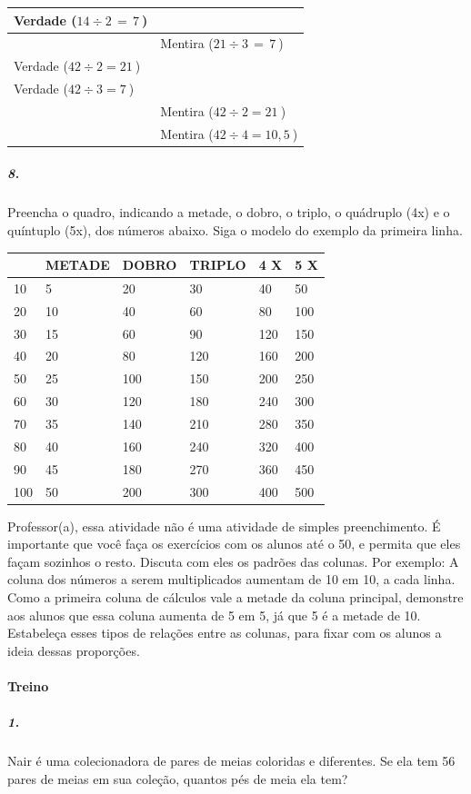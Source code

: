 \begin{longtable}[]{@{}ll@{}}
\toprule
Verdade (\(14 \div 2\, = \, 7\ \)) &\tabularnewline
\midrule
\endhead
& Mentira (\(21 \div 3\, = \, 7\ \))\tabularnewline
Verdade (\(42 \div 2 = 21\ \)) &\tabularnewline
Verdade (\(42 \div 3 = 7\ \)) &\tabularnewline
& Mentira (\(42 \div 2 = 21\ \))\tabularnewline
& Mentira (\(42 \div 4 = 10,5\ \))\tabularnewline
\bottomrule
\end{longtable}

\subparagraph{8.}\label{section-96}

Preencha o quadro, indicando a metade, o dobro, o triplo, o quádruplo
(4x) e o quíntuplo (5x), dos números abaixo. Siga o modelo do exemplo da
primeira linha.

\begin{longtable}[]{@{}llllll@{}}
\toprule
& METADE & DOBRO & TRIPLO & 4 X & 5 X\tabularnewline
\midrule
\endhead
10 & 5 & 20 & 30 & 40 & 50\tabularnewline
20 & 10 & 40 & 60 & 80 & 100\tabularnewline
30 & 15 & 60 & 90 & 120 & 150\tabularnewline
40 & 20 & 80 & 120 & 160 & 200\tabularnewline
50 & 25 & 100 & 150 & 200 & 250\tabularnewline
60 & 30 & 120 & 180 & 240 & 300\tabularnewline
70 & 35 & 140 & 210 & 280 & 350\tabularnewline
80 & 40 & 160 & 240 & 320 & 400\tabularnewline
90 & 45 & 180 & 270 & 360 & 450\tabularnewline
100 & 50 & 200 & 300 & 400 & 500\tabularnewline
\bottomrule
\end{longtable}

Professor(a), essa atividade não é uma atividade de simples
preenchimento. É importante que você faça os exercícios com os alunos
até o 50, e permita que eles façam sozinhos o resto. Discuta com eles os
padrões das colunas. Por exemplo: A coluna dos números a serem
multiplicados aumentam de 10 em 10, a cada linha. Como a primeira coluna
de cálculos vale a metade da coluna principal, demonstre aos alunos que
essa coluna aumenta de 5 em 5, já que 5 é a metade de 10. Estabeleça
esses tipos de relações entre as colunas, para fixar com os alunos a
ideia dessas proporções.

\paragraph{Treino}\label{treino-7}

\subparagraph{1.}\label{section-97}

Nair é uma colecionadora de pares de meias coloridas e diferentes. Se
ela tem 56 pares de meias em sua coleção, quantos pés de meia ela tem?

